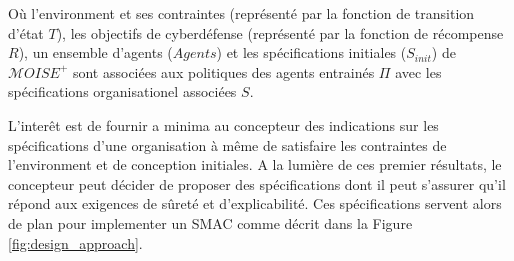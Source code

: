 \documentclass[conference]{IEEEtran}
\begin{document}



Où l'environment et ses contraintes (représenté par la fonction de transition d'état $T$), les objectifs de cyberdéfense (représenté par la fonction de récompense $R$), un ensemble d'agents ($Agents$) et les spécifications initiales ($S_{init}$) de $\mathcal{M}OISE^{+}$ sont associées aux politiques des agents entrainés $\Pi$ avec les spécifications organisationel associées $S$.

L'interêt est de fournir a minima au concepteur des indications sur les spécifications d'une organisation à même de satisfaire les contraintes de l'environment et de conception initiales. A la lumière de ces premier résultats, le concepteur peut décider de proposer des spécifications dont il peut s'assurer qu'il répond aux exigences de sûreté et d'explicabilité. Ces spécifications servent alors de plan pour implementer un SMAC comme décrit dans la Figure \ref{fig:design_approach}.
\end{document}
